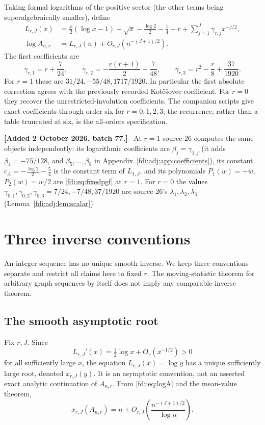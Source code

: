 \documentclass[11pt,letterpaper]{article}
\theoremstyle{remark}\newtheorem{remark}[theorem]{Remark}
\newenvironment{mergenote}[1][2 October 2026, batch 77]{\par\smallskip\begingroup\small\noindent\textbf{[Added #1.]}\ }{\endgroup\par\smallskip}
\begin{document}
Taking formal logarithms of the positive sector (the other terms being superalgebraically smaller), define
\begin{align}
 L_{r,J}(x)&=\frac x2(\log x-1)+\sqrt x-\frac{\log2}2-\frac14-r
 +\sum_{j=1}^J\gamma_{r,j}x^{-j/2},\label{fdi:eq:logL}\\
 \log A_{n,r}&=L_{r,J}(n)+O_{r,J}(n^{-(J+1)/2}).\label{fdi:eq:logA}
\end{align}
The first coefficients are
\begin{equation}\label{fdi:eq:gammas}
 \gamma_{r,1}=r+\frac7{24},\qquad
 \gamma_{r,2}=-\frac{r(r+1)}2-\frac7{48},\qquad
 \gamma_{r,3}=r^2-\frac r8+\frac{37}{1920}.
\end{equation}
For $r=1$ these are $31/24,-55/48,1717/1920$. In particular the first absolute correction agrees with the previously recorded Kot\v{e}\v{s}ovec coefficient. For $r=0$ they recover the unrestricted-involution coefficients. The companion scripts give exact coefficients through order six for $r=0,1,2,3$; the recurrence, rather than a table truncated at six, is the all-orders specification.

\begin{mergenote}
At $r=1$ source 26 computes the same objects independently: its logarithmic coefficients are $\beta_j=\gamma_{1,j}$ (it adds $\beta_4=-75/128$, and $\beta_5,\ldots,\beta_8$ in Appendix~\ref{fdi:adj:app:coefficients}), its constant $c_A=-\tfrac{\log 2}2-\tfrac54$ is the constant term of $L_{1,J}$, and its polynomials $P_1(w)=-w$, $P_2(w)=w/2$ are \eqref{fdi:eq:fixedpgf} at $r=1$. For $r=0$ the values $\gamma_{0,1},\gamma_{0,2},\gamma_{0,3}=7/24,-7/48,37/1920$ are source 26's $\lambda_1,\lambda_2,\lambda_3$ (Lemma~\ref{fdi:adj:lem:scalar}).
\end{mergenote}

\section{Three inverse conventions}\label{fdi:sec:inverse}
An integer sequence has no unique smooth inverse. We keep three conventions separate and restrict all claims here to fixed $r$. The moving-statistic theorem for arbitrary graph sequences by itself does not imply any comparable inverse theorem.

\subsection{The smooth asymptotic root}
Fix $r,J$. Since
\[
 L_{r,J}'(x)=\tfrac12\log x+O_r(x^{-1/2})>0
\]
for all sufficiently large $x$, the equation $L_{r,J}(x)=\log y$ has a unique sufficiently large root, denoted $x_{r,J}(y)$. It is an asymptotic convention, not an asserted exact analytic continuation of $A_{n,r}$. From \eqref{fdi:eq:logA} and the mean-value theorem,
\begin{equation}\label{fdi:eq:nodeinv}
 x_{r,J}(A_{n,r})=n+O_{r,J}\!\left(\frac{n^{-(J+1)/2}}{\log n}\right).
\end{equation}
\end{document}

